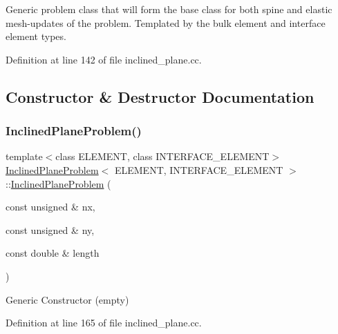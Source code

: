 Generic problem class that will form the base class for both spine and elastic mesh-\/updates of the problem. Templated by the bulk element and interface element types. 

Definition at line 142 of file inclined\+\_\+plane.\+cc.



\subsection{Constructor \& Destructor Documentation}
\mbox{\label{classInclinedPlaneProblem_a52d15d242c8f17a340914996b49a32a3}} 
\subsubsection{\texorpdfstring{Inclined\+Plane\+Problem()}{InclinedPlaneProblem()}}
{\footnotesize\ttfamily template$<$class E\+L\+E\+M\+E\+NT, class I\+N\+T\+E\+R\+F\+A\+C\+E\+\_\+\+E\+L\+E\+M\+E\+NT$>$ \\
\hyperlink{classInclinedPlaneProblem}{Inclined\+Plane\+Problem}$<$ E\+L\+E\+M\+E\+NT, I\+N\+T\+E\+R\+F\+A\+C\+E\+\_\+\+E\+L\+E\+M\+E\+NT $>$\+::\hyperlink{classInclinedPlaneProblem}{Inclined\+Plane\+Problem} (\begin{DoxyParamCaption}\item[{const unsigned \&}]{nx,  }\item[{const unsigned \&}]{ny,  }\item[{const double \&}]{length }\end{DoxyParamCaption})\hspace{0.3cm}{\ttfamily [inline]}}



Generic Constructor (empty) 



Definition at line 165 of file inclined\+\_\+plane.\+cc.

\mbox{\label{classInclinedPlaneProblem_ad89c7dc7975bf128a7c249496fabc97f}} 
